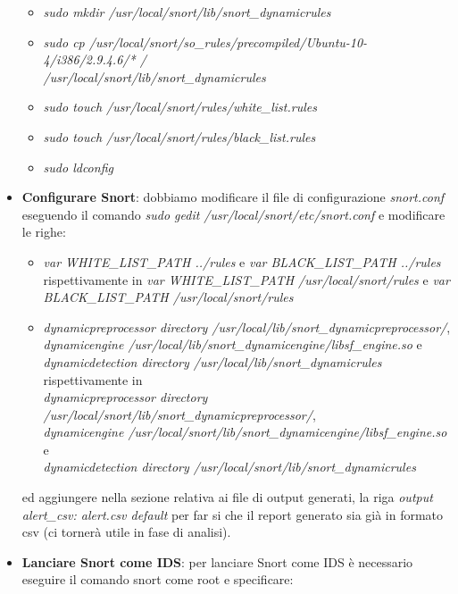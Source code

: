 \begin{itemize}
\begin{itemize}
		            \item \textit{sudo mkdir /usr/local/snort/lib/snort\_dynamicrules}
		            \item \textit{sudo cp /usr/local/snort/so\_rules/precompiled/Ubuntu-10-4/i386/2.9.4.6/* /\\ /usr/local/snort/lib/snort\_dynamicrules}
		            \item \textit{sudo touch /usr/local/snort/rules/white\_list.rules}
		            \item \textit{sudo touch /usr/local/snort/rules/black\_list.rules}
		            \item \textit{sudo ldconfig}
		        \end{itemize}
		  \item \textbf{Configurare Snort}: dobbiamo modificare il file di configurazione \textit{snort.conf} eseguendo il comando \textit{sudo gedit /usr/local/snort/etc/snort.conf} e modificare le righe:
		        \begin{itemize}
		            \item \textit{var WHITE\_LIST\_PATH ../rules} e \textit{var BLACK\_LIST\_PATH ../rules} rispettivamente in \textit{var WHITE\_LIST\_PATH /usr/local/snort/rules} e \textit{var BLACK\_LIST\_PATH /usr/local/snort/rules}
		            \item \textit{dynamicpreprocessor directory /usr/local/lib/snort\_dynamicpreprocessor/},\\ \textit{dynamicengine /usr/local/lib/snort\_dynamicengine/libsf\_engine.so} e \\ \textit{dynamicdetection directory /usr/local/lib/snort\_dynamicrules} rispettivamente in \\ \textit{dynamicpreprocessor directory /usr/local/snort/lib/snort\_dynamicpreprocessor/},\\ \textit{dynamicengine /usr/local/snort/lib/snort\_dynamicengine/libsf\_engine.so} e \\ \textit{dynamicdetection directory /usr/local/snort/lib/snort\_dynamicrules}
		        \end{itemize}
		        ed aggiungere nella sezione relativa ai file di output generati, la riga \textit{output alert\_csv: alert.csv default} per far si che il report generato sia già in formato csv (ci tornerà utile in fase di analisi).
		  \item \textbf{Lanciare Snort come IDS}: per lanciare Snort come IDS è necessario eseguire il comando snort come root e specificare:
		      \begin{itemize}

\end{itemize}
\end{itemize}
